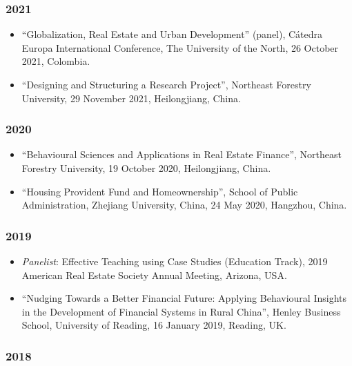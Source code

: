 \documentclass[11pt,a4paper]{article}
\providecommand{\tightlist}{%
  \setlength{\itemsep}{1pt}\setlength{\parskip}{0pt}}
\begin{document}
\subsubsection{2021}\label{section-24}

\begin{itemize}
\tightlist
\item
  ``Globalization, Real Estate and Urban Development'' (panel), Cátedra
  Europa International Conference, The University of the North, 26
  October 2021, Colombia.
\item
  ``Designing and Structuring a Research Project'', Northeast Forestry
  University, 29 November 2021, Heilongjiang, China.
\end{itemize}

\subsubsection{2020}\label{section-25}

\begin{itemize}
\tightlist
\item
  ``Behavioural Sciences and Applications in Real Estate Finance'',
  Northeast Forestry University, 19 October 2020, Heilongjiang, China.
\item
  ``Housing Provident Fund and Homeownership'', School of Public
  Administration, Zhejiang University, China, 24 May 2020, Hangzhou,
  China.
\end{itemize}

\subsubsection{2019}\label{section-26}

\begin{itemize}
\tightlist
\item
  \emph{Panelist}: Effective Teaching using Case Studies (Education
  Track), 2019 American Real Estate Society Annual Meeting, Arizona,
  USA.
\item
  ``Nudging Towards a Better Financial Future: Applying Behavioural
  Insights in the Development of Financial Systems in Rural China'',
  Henley Business School, University of Reading, 16 January 2019,
  Reading, UK.
\end{itemize}

\subsubsection{2018}\label{section-27}
\end{document}
